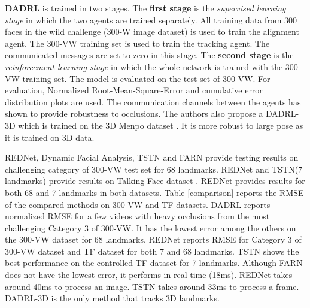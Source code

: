 \documentclass{llncs}
\begin{document}
	\textbf{DADRL} \cite{dadrl} is trained in two stages. The \textbf{first stage} is the \textit{supervised learning stage} in which the two agents are trained separately. All training data from 300 faces in the wild challenge (300-W image dataset) is used to train the alignment agent. The 300-VW training set is used to train the tracking agent. The communicated messages are set to zero in this stage. The \textbf{second stage} is the \textit{reinforcement learning stage} in which the whole network is trained with the 300-VW training set. The model is evaluated on the test set of 300-VW. For evaluation, Normalized Root-Mean-Square-Error and cumulative error distribution plots are used. The communication channels between the agents has shown to provide robustness to occlusions. The authors also propose a DADRL-3D which is trained on the 3D Menpo dataset \cite{3d_menpo}. It is more robust to large pose as it is trained on 3D data.
	

	
	REDNet\cite{rednet}, Dynamic Facial Analysis\cite{dynamic_facial_analysis}, TSTN\cite{tstn} and FARN\cite{farn} provide testing results on challenging category of 300-VW test set for 68 landmarks. REDNet\cite{rednet} and TSTN\cite{tstn}(7 landmarks) provide results on Talking Face dataset \cite{tf}. REDNet\cite{rednet} provides results for both 68 and 7 landmarks in both datasets.
	Table \ref{comparison} reports the RMSE of the compared methods on 300-VW and TF\cite{tf} datasets.
	DADRL\cite{dadrl} reports normalized RMSE for a few videos with heavy occlusions from the most challenging Category 3 of 300-VW. It has the lowest error among the others on the 300-VW dataset for 68 landmarks.
	REDNet\cite{rednet} reports RMSE for Category 3 of 300-VW dataset and TF dataset for both 7 and 68 landmarks. TSTN\cite{tstn} shows the best performance on the controlled TF dataset for 7 landmarks. Although FARN\cite{farn} does not have the lowest error, it performs in real time (18ms). REDNet\cite{rednet} takes around 40ms to process an image. TSTN\cite{tstn} takes around 33ms to process a frame. DADRL-3D is the only method that tracks 3D landmarks.
	
\end{document}
